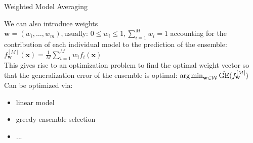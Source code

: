 \documentclass[11pt,compress,t,notes=noshow, aspectratio=169, xcolor=table]{beamer}
\begin{document}

\begin{vbframe}{Weighted Model Averaging}

We can also introduce weights $\mathbf{w} = (w_{i}, \ldots, w_{m}), \text{usually: } 0 \le w_{i} \le 1, \sum_{i=1}^{M} w_{i} = 1$ accounting for the contribution of each individual model to the prediction of the ensemble: $f_{\mathbf{w}}^{[M]}(\mathbf{x}) = \frac{1}{M} \sum_{i = 1}^{M} w_{i} f_{i}(\mathbf{x})$\\
\vspace{1em}
This gives rise to an optimization problem to find the optimal weight vector so that the generalization error of the ensemble is optimal:
$\operatorname{arg\,min}_{\mathbf{w} \in \mathcal{W}} \hat{\text{GE}}(f_{\mathbf{w}}^{[M]})$\\
\vspace{1em}
Can be optimized via:
\begin{itemize}
    \item linear model
    \item greedy ensemble selection
    \item ...
\end{itemize}

\end{vbframe}

\end{document}
